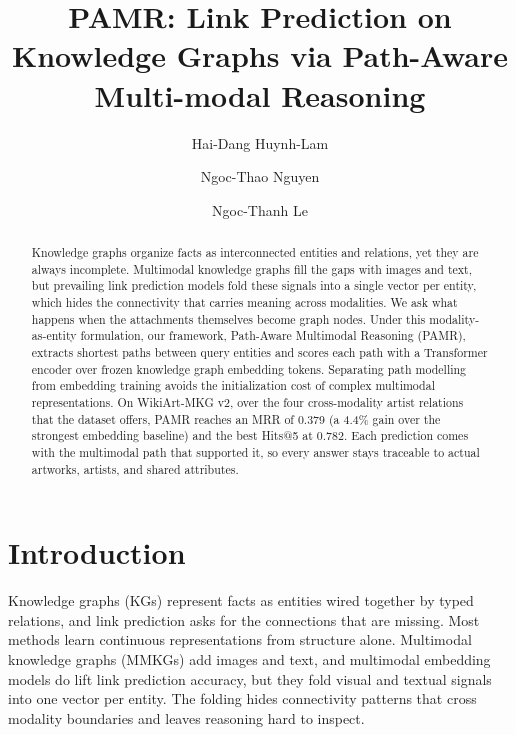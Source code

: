 \documentclass[runningheads]{llncs}
\begin{document}
%
\title{PAMR: Link Prediction on Knowledge Graphs via Path-Aware Multi-modal Reasoning}
%

\author{Hai-Dang Huynh-Lam \and
  Ngoc-Thao Nguyen \and
Ngoc-Thanh Le}
%
%
\maketitle  %
%
\begin{abstract}
  Knowledge graphs organize facts as interconnected entities and relations, yet
  they are always incomplete. Multimodal knowledge graphs fill the gaps with
  images and text, but prevailing link prediction models fold these signals into
  a single vector per entity, which hides the connectivity that carries meaning
  across modalities. We ask what happens when the attachments themselves become
  graph nodes. Under this modality-as-entity formulation, our framework,
  Path-Aware Multimodal Reasoning (PAMR), extracts shortest paths between query
  entities and scores each path with a Transformer encoder over frozen knowledge
  graph embedding tokens. Separating path modelling from embedding training
  avoids the initialization cost of complex multimodal representations. On
  WikiArt-MKG v2, over the four cross-modality artist relations that the dataset
  offers, PAMR reaches an MRR of 0.379 (a 4.4\% gain over the strongest embedding
  baseline) and the best Hits@5 at 0.782. Each prediction comes with the
  multimodal path that supported it, so every answer stays traceable to
  actual artworks, artists, and shared attributes.

\end{abstract}
%
%
%

\section{Introduction}
\label{sec:introduction}

Knowledge graphs (KGs) represent facts as entities wired together by typed relations, and link prediction asks for the connections that are missing. Most methods learn continuous representations from structure alone. Multimodal knowledge graphs (MMKGs) add images and text, and multimodal embedding models do lift link prediction accuracy, but they fold visual and textual signals into one vector per entity. The folding hides connectivity patterns that cross modality boundaries and leaves reasoning hard to inspect.
\end{document}
